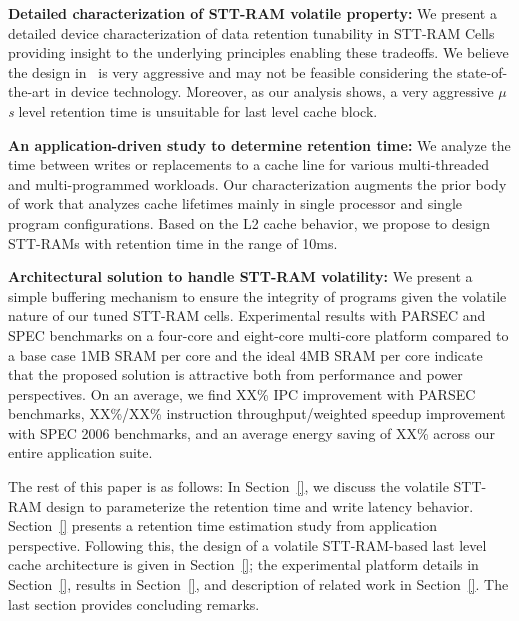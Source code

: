 \noindent\textbf{Detailed characterization of STT-RAM volatile property:} We present a detailed
device characterization of data retention tunability in STT-RAM Cells providing insight to the
underlying principles enabling these tradeoffs. We believe the design in~\cite{STTRAM:HPCA11} is very
aggressive and may not be feasible considering the state-of-the-art in device technology. Moreover,
as our analysis shows, a very aggressive {\it $\mu$s} level retention time is unsuitable for last
level cache block.

\noindent\textbf{An application-driven study to determine retention time:}
We analyze the time between writes or replacements to a cache line for
various multi-threaded and multi-programmed workloads. Our characterization
augments the prior body of work that analyzes cache lifetimes mainly in
single processor and single program configurations. Based on the L2 cache
behavior, we propose to design STT-RAMs with retention time in the range of 10ms.

\noindent\textbf{Architectural solution to handle STT-RAM volatility:} We present a simple buffering
mechanism to ensure the integrity of programs given the volatile nature of our tuned STT-RAM cells.
Experimental results with PARSEC and SPEC benchmarks on a four-core and eight-core multi-core platform
compared to a base case 1MB SRAM per core and the ideal 4MB SRAM per core indicate that the proposed
solution is attractive both from performance and power perspectives. On an average, we find XX\% IPC
improvement with PARSEC benchmarks, XX\%/XX\% instruction throughput/weighted speedup improvement
with SPEC 2006 benchmarks, and an average energy saving of XX\% across our entire application suite.



The rest of this paper is as follows: In Section~\ref{}, we discuss the volatile STT-RAM design to
parameterize the retention time and write latency behavior. Section~\ref{} presents a retention time
estimation study from application perspective. Following this, the design of a volatile STT-RAM-based last
level cache architecture is given in Section~\ref{}; the experimental platform details in Section~\ref{},
results in Section~\ref{}, and description of related work in Section~\ref{}.
The last section provides concluding remarks.


